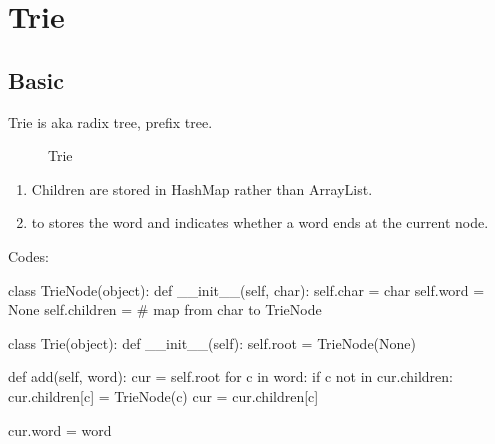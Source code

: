 \section{Trie}
\subsection{Basic}
Trie is aka radix tree, prefix tree. 
\begin{figure}[hbtp]
\centering
{}
\caption{Trie}
\label{fig:trie} 
\end{figure}
\begin{enumerate}
\item Children are stored in HashMap rather than ArrayList. 
\item {} to stores the word and indicates whether a word ends at the current
node. 
\end{enumerate}
Codes:
\begin{python}
class TrieNode(object):
    def __init__(self, char):
        self.char = char
        self.word = None
        self.children = {}  # map from char to TrieNode


class Trie(object):
    def __init__(self):
        self.root = TrieNode(None)

    def add(self, word):
        cur = self.root
        for c in word:
            if c not in cur.children:
                cur.children[c] = TrieNode(c)
            cur = cur.children[c]
            
        cur.word = word
\end{python}

